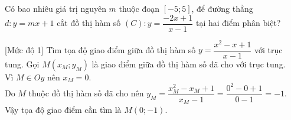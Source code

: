 \begin{bt}%
Có bao nhiêu giá trị nguyên $m$ thuộc đoạn $[-5;5]$, để đường thẳng $d:y=mx+1$ cắt đồ thị hàm số $(C)\colon y=\dfrac{-2x+1}{x-1}$ tại hai điểm phân biệt?
\end{bt}

\begin{bt}%
[Mức độ 1]%
Tìm tọa độ giao điểm giữa đồ thị hàm số $y=\dfrac{x^2-x+1}{x-1}$ với trục tung.
\loigiai
{Gọi $M(x_M;y_M)$ là giao điểm giữa đồ thị hàm số đã cho với trục tung.\\
Vì $M\in Oy$ nên $x_M=0$.\\
Do $M$ thuộc đồ thị hàm số đã cho nên $y_M=\dfrac{x_M^2-x_M+1}{x_M-1}=\dfrac{0^2-0+1}{0-1}=-1$.\\
Vậy tọa độ giao điểm cần tìm là $M(0;-1)$.
}
\end{bt}

